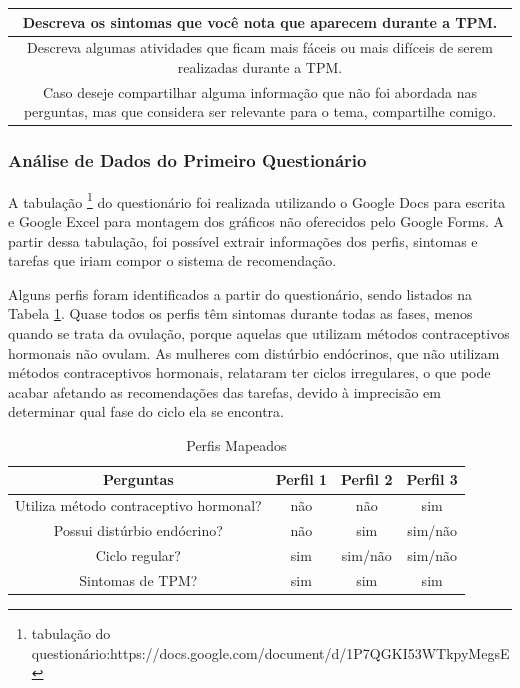 \begin{table}[ht]
\begin{tabular}{c}
        \midrule
        \begin{minipage} [t] {1\textwidth} Descreva os sintomas que você nota que aparecem durante a TPM.\end{minipage}\\
        \midrule
        \begin{minipage} [t] {1\textwidth} Descreva algumas atividades que ficam mais fáceis ou mais difíceis de serem realizadas durante a TPM.\end{minipage}\\
        \midrule
        \begin{minipage} [t] {1\textwidth} Caso deseje compartilhar alguma informação que não foi abordada nas perguntas, mas que considera ser relevante para o tema, compartilhe comigo. \end{minipage}\\

        \bottomrule
    \end{tabular} 
\end{table}


\subsubsection{Análise de Dados do Primeiro Questionário}
\label{vsf1}

A tabulação \footnote{tabulação do questionário:https://docs.google.com/document/d/1P7QGKI53WTkpyMegsE} do 
questionário foi realizada utilizando o Google Docs para escrita e Google Excel para montagem 
dos gráficos não oferecidos 
pelo Google Forms. A partir dessa tabulação, foi possível extrair informações dos perfis, 
sintomas e tarefas que iriam compor o sistema de recomendação.

Alguns perfis foram identificados a partir do questionário, sendo listados na Tabela \ref{tab09}. 
Quase todos os perfis têm sintomas durante todas as fases, menos quando se trata da ovulação, porque aquelas 
que utilizam métodos contraceptivos hormonais não ovulam. As mulheres com distúrbio endócrinos, 
que não utilizam métodos contraceptivos hormonais, relataram ter ciclos irregulares, o que pode acabar afetando 
as recomendações das tarefas, devido à imprecisão em determinar qual fase do ciclo ela se encontra.

\begin{table}[ht] 
    \centering
    \caption{Perfis Mapeados}
    \label{tab09} 
    \begin{tabular}{cccc}
    \toprule
     Perguntas & Perfil 1 & Perfil 2 & Perfil 3  \\ 
     \midrule     
     Utiliza método contraceptivo hormonal?& não & não & sim \\ 
    \midrule     
    Possui distúrbio endócrino? & não & sim & sim/não \\ 
    \midrule     
    Ciclo regular? & sim & sim/não & sim/não  \\ 
    \midrule     
    Sintomas de TPM? & sim & sim & sim \\ 
    \bottomrule
    \end{tabular}
    \end{table}


